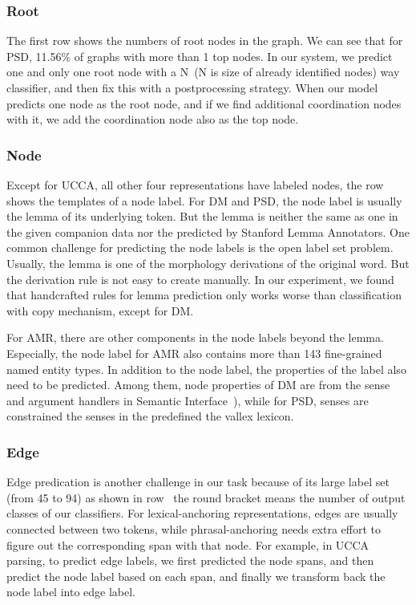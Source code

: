 \subsubsection{Root}
\label{sssec:lex:root}

The first row  shows the numbers of root nodes in the graph.
We can see that for PSD, 11.56\% of graphs with more than 1 top
nodes. In our system, we predict one and only one root node with a
N~(N is size of already identified nodes) way classifier, and then fix
this with a postprocessing strategy. When our model predicts one node
as the root node, and if we find additional coordination nodes with
it, we add the coordination node also as the top node.

\subsubsection{Node}
\label{sssec:lex:node}

Except for UCCA, all other four representations have labeled
nodes, the row  shows the templates of a node label. For
DM and PSD, the node label is usually the lemma of its underlying
token. But the lemma is neither the same as one in the given companion
data nor the predicted by Stanford Lemma Annotators. One common
challenge for predicting the node labels is the open label set
problem. Usually, the lemma is one of the morphology derivations of
the original word. But the derivation rule is not easy to create
manually. In our experiment, we found that handcrafted rules for lemma
prediction only works worse than classification with copy mechanism,
except for DM.

For AMR, there are other components in the node labels beyond the
lemma. Especially, the node label for AMR also contains more than 143
fine-grained named entity types. In addition to the node label, the
properties of the label also need to be predicted. Among them, node
properties of DM are from the sense and argument handlers in Semantic
Interface~\citep[SEM-I,][]{Fli:Lon:Dyv:05}), while for PSD, senses are
constrained the senses in the predefined the vallex lexicon.

\subsubsection{Edge}
\label{sssec:lex:edge}

Edge predication is another challenge in our task because of its large
label set (from 45 to 94) as shown in row ~the
round bracket means the number of output classes of our
classifiers. For lexical-anchoring representations, edges are usually
connected between two tokens, while phrasal-anchoring needs extra
effort to figure out the corresponding span with that node. For
example, in UCCA parsing, to predict edge labels, we first predicted
the node spans, and then predict the node label based on each span,
and finally we transform back the node label into edge label.

